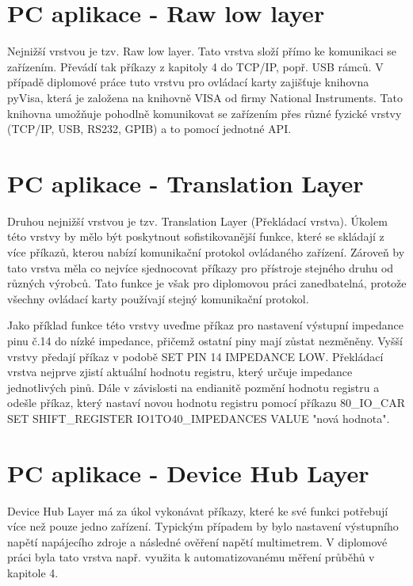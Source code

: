 \section{PC aplikace - Raw low layer}
Nejnižší vrstvou je tzv. Raw low layer. Tato vrstva složí přímo ke komunikaci se zařízením. Převádí tak příkazy z kapitoly 4 do TCP/IP, popř. USB rámců.
V případě diplomové práce tuto vrstvu pro ovládací karty zajišťuje knihovna pyVisa, která je založena na knihovně VISA od firmy National Instruments.
Tato knihovna umožňuje pohodlně komunikovat se zařízením přes různé fyzické vrstvy (TCP/IP, USB, RS232, GPIB) a to pomocí jednotné API.\par


\section{PC aplikace - Translation Layer}
Druhou nejnižší vrstvou je tzv. Translation Layer (Překládací vrstva). Úkolem této vrstvy by mělo být poskytnout sofistikovanější funkce, které se skládají z více příkazů,
kterou nabízí komunikační protokol ovládaného zařízení. Zároveň by tato vrstva měla co nejvíce sjednocovat příkazy pro přístroje stejného druhu od různých výrobců.
Tato funkce je však pro diplomovou práci zanedbatelná, protože všechny ovládací karty používají stejný komunikační protokol.\par

Jako příklad funkce této vrstvy uveďme příkaz pro nastavení výstupní impedance pinu č.14 do nízké impedance, přičemž ostatní piny mají zůstat nezměněny.
Vyšší vrstvy předají příkaz v podobě SET PIN 14 IMPEDANCE LOW. Překládací vrstva nejprve zjistí aktuální hodnotu registru, který určuje impedance jednotlivých pinů.
Dále v závislosti na endianitě pozmění hodnotu registru a odešle příkaz, který nastaví novou hodnotu registru pomocí příkazu
80\_IO\_CAR SET SHIFT\_REGISTER IO1TO40\_IMPEDANCES VALUE "nová hodnota".\par


\section{PC aplikace - Device Hub Layer}
Device Hub Layer má za úkol vykonávat příkazy, které ke své funkci potřebují více než pouze jedno zařízení.
Typickým případem by bylo nastavení výstupního napětí napájecího zdroje a následné ověření napětí multimetrem.
V diplomové práci byla tato vrstva např. využita k automatizovanému měření průběhů v kapitole 4.\par

